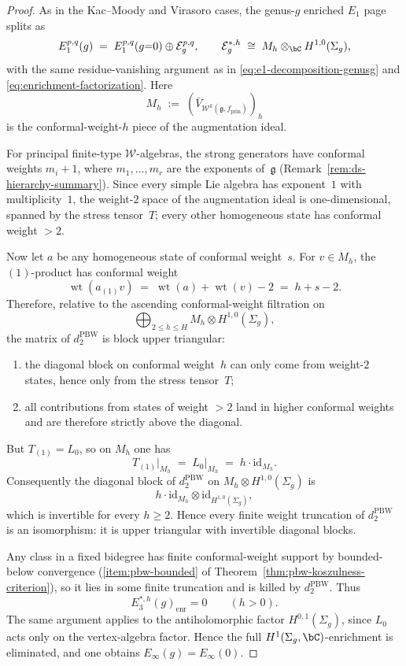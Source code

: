 \begin{proof}
As in the Kac--Moody and Virasoro cases, the genus-$g$ enriched
$E_1$ page splits as
\[
E_1^{p,q}(g)
\;=\;
E_1^{p,q}(g{=}0) \oplus \mathcal{E}^{p,q}_g,
\qquad
\mathcal{E}_g^{*,h}
\;\cong\;
M_h \otimes_{\bC} H^{1,0}(\Sigma_g),
\]
with the same residue-vanishing argument as in
\eqref{eq:e1-decomposition-genusg} and
\eqref{eq:enrichment-factorization}.  Here
\[
M_h \;:=\; (\bar{V}_{\mathcal{W}^k(\mathfrak{g}, f_{\mathrm{prin}})})_h
\]
is the conformal-weight-$h$ piece of the augmentation ideal.

For principal finite-type $\mathcal{W}$-algebras, the strong
generators have conformal weights $m_i + 1$, where
$m_1,\ldots,m_r$ are the exponents of~$\mathfrak{g}$
\textup{(}Remark~\textup{\ref{rem:ds-hierarchy-summary}}\textup{)}.
Since every simple Lie algebra has exponent~$1$ with multiplicity~$1$,
the weight-$2$ space of the augmentation ideal is one-dimensional,
spanned by the stress tensor~$T$; every other homogeneous state has
conformal weight $> 2$.

Now let $a$ be any homogeneous state of conformal weight~$s$.
For $v \in M_h$, the $(1)$-product has conformal weight
\[
\operatorname{wt}(a_{(1)}v)
\;=\;
\operatorname{wt}(a) + \operatorname{wt}(v) - 2
\;=\;
h + s - 2.
\]
Therefore, relative to the ascending conformal-weight filtration on
\[
\bigoplus_{2 \leq h \leq H}
M_h \otimes H^{1,0}(\Sigma_g),
\]
the matrix of $d_2^{\mathrm{PBW}}$ is block upper triangular:
\begin{enumerate}[label=\textup{(\roman*)}]
\item the diagonal block on conformal weight~$h$ can only come from
  weight-$2$ states, hence only from the stress tensor~$T$;
\item all contributions from states of weight $> 2$ land in higher
  conformal weights and are therefore strictly above the diagonal.
\end{enumerate}
But $T_{(1)} = L_0$, so on $M_h$ one has
\[
T_{(1)}\big|_{M_h}
\;=\;
L_0\big|_{M_h}
\;=\;
h \cdot \mathrm{id}_{M_h}.
\]
Consequently the diagonal block of $d_2^{\mathrm{PBW}}$ on
$M_h \otimes H^{1,0}(\Sigma_g)$ is
\[
h \cdot \mathrm{id}_{M_h}
\otimes
\mathrm{id}_{H^{1,0}(\Sigma_g)},
\]
which is invertible for every $h \geq 2$.
Hence every finite weight truncation of
$d_2^{\mathrm{PBW}}$ is an isomorphism:
it is upper triangular with invertible diagonal blocks.

Any class in a fixed bidegree has finite conformal-weight support by
bounded-below convergence
\textup{(}\ref{item:pbw-bounded} of
Theorem~\ref{thm:pbw-koszulness-criterion}\textup{)},
so it lies in some finite truncation and is killed by
$d_2^{\mathrm{PBW}}$.
Thus
\[
E_3^{*,h}(g)_{\mathrm{enr}} = 0
\qquad (h > 0).
\]
The same argument applies to the antiholomorphic factor
$H^{0,1}(\Sigma_g)$, since $L_0$ acts only on the vertex-algebra
factor.  Hence the full $H^1(\Sigma_g,\bC)$-enrichment is eliminated,
and one obtains $E_\infty(g) = E_\infty(0)$.


\end{proof}
